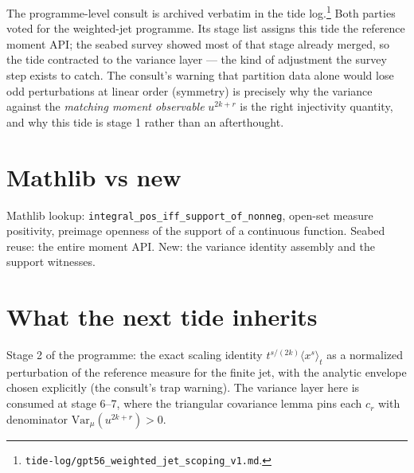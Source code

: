 \documentclass[11pt]{article}
\begin{document}
The programme-level consult is archived verbatim in the tide
log.\footnote{\texttt{tide-log/gpt56\_weighted\_jet\_scoping\_v1.md}.}
Both parties voted for the weighted-jet programme. Its stage list assigns this tide the
reference moment API; the seabed survey showed most of that stage
already merged, so the tide contracted to the variance layer --- the
kind of adjustment the survey step exists to catch. The consult's
warning that partition data alone would lose odd perturbations at
linear order (symmetry) is precisely why the variance against the
\emph{matching moment observable} $u^{2k+r}$ is the right injectivity
quantity, and why this tide is stage 1 rather than an afterthought.

\section{Mathlib vs new}

Mathlib lookup: \texttt{integral\_pos\_iff\_support\_of\_nonneg},
open-set measure positivity, preimage openness of the support of a
continuous function. Seabed reuse: the entire moment API. New: the
variance identity assembly and the support witnesses.

\section{What the next tide inherits}

Stage 2 of the programme: the exact scaling identity
$t^{s/(2k)}\langle x^s \rangle_t$ as a normalized perturbation of the
reference measure for the finite jet, with the analytic envelope
chosen explicitly (the consult's trap warning). The variance layer
here is consumed at stage 6--7, where the triangular covariance lemma
pins each $c_r$ with denominator $\mathrm{Var}_{\mu}(u^{2k+r}) > 0$.
\end{document}
